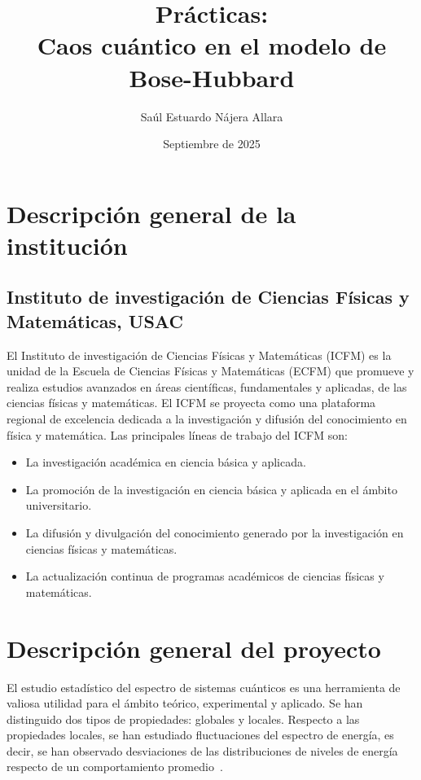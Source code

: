 \documentclass[spanish,titlepage,table]{practicas}
\institute{
    Universidad de San Carlos de Guatemala\\[.5em]
    Escuela de Ciencias Físicas y Matemáticas
}
\title{
    {\LARGE Prácticas:}\\[0.5em]
   Caos cuántico en el modelo de\\[0.4em]
	 Bose-Hubbard 
}
\author{Saúl Estuardo Nájera Allara}
\date{Septiembre de 2025}
\begin{document}
\maketitle

\section{Descripción general de la institución}\label{sec:institution}
\subsection{Instituto de investigación de Ciencias Físicas y Matemáticas, USAC} 
El Instituto de investigación de Ciencias Físicas y Matemáticas (ICFM) es la unidad de la Escuela de Ciencias Físicas y Matemáticas (ECFM) que promueve y realiza estudios avanzados en áreas científicas, fundamentales y aplicadas, de las ciencias físicas y matemáticas. El ICFM se proyecta como una plataforma regional de excelencia dedicada a la investigación y difusión del conocimiento en física y matemática. Las principales líneas de trabajo del ICFM son:
\begin{itemize}
    \item La investigación académica en ciencia básica y aplicada.
    \item La promoción de la investigación en ciencia básica y aplicada en el ámbito universitario.
    \item La difusión y divulgación del conocimiento generado por la investigación en ciencias físicas y matemáticas.
    \item La actualización continua de programas académicos de ciencias físicas y matemáticas.
\end{itemize}

\section{Descripción general del proyecto}\label{sec:description}

El estudio estadístico del espectro de sistemas cuánticos es una herramienta de valiosa utilidad para el ámbito teórico, experimental y aplicado.
Se han distinguido dos tipos de propiedades: globales y locales.
Respecto a las propiedades locales, se han estudiado fluctuaciones del espectro de energía, es decir, se han observado desviaciones de las distribuciones de niveles de energía respecto de un comportamiento promedio~\cite{Bohigas_1984}.
\end{document}
